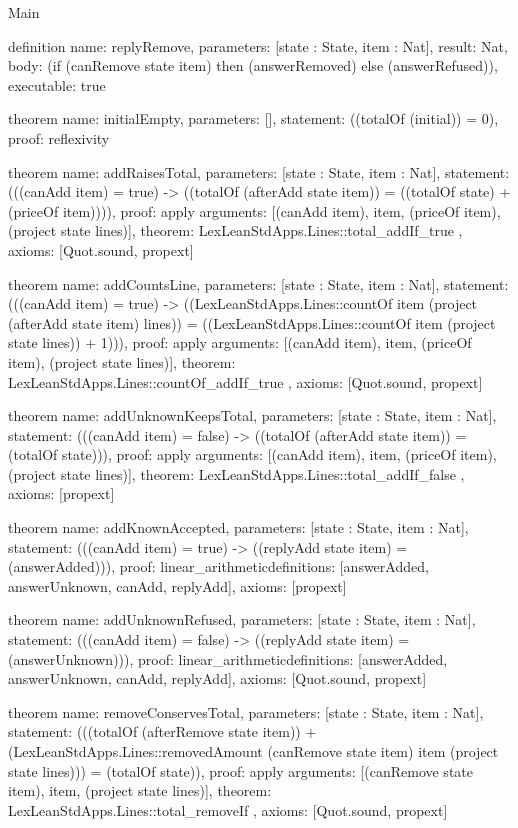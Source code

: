 \begin{lexlean}{Main}
\begin{semanticmodule}
definition{
  name: replyRemove,
  parameters: [state : State, item : Nat],
  result: Nat,
  body: (if (canRemove state item) then (answerRemoved) else (answerRefused)),
  executable: true
}

theorem{
  name: initialEmpty,
  parameters: [],
  statement: ((totalOf (initial)) = 0),
  proof: reflexivity{}
}

theorem{
  name: addRaisesTotal,
  parameters: [state : State, item : Nat],
  statement: (((canAdd item) = true) -> ((totalOf (afterAdd state item)) = ((totalOf state) + (priceOf item)))),
  proof: apply{
    arguments: [(canAdd item), item, (priceOf item), (project state lines)],
    theorem: LexLeanStdApps.Lines::total_addIf_true
  },
  axioms: [Quot.sound, propext]
}

theorem{
  name: addCountsLine,
  parameters: [state : State, item : Nat],
  statement: (((canAdd item) = true) -> ((LexLeanStdApps.Lines::countOf item (project (afterAdd state item) lines)) = ((LexLeanStdApps.Lines::countOf item (project state lines)) + 1))),
  proof: apply{
    arguments: [(canAdd item), item, (priceOf item), (project state lines)],
    theorem: LexLeanStdApps.Lines::countOf_addIf_true
  },
  axioms: [Quot.sound, propext]
}

theorem{
  name: addUnknownKeepsTotal,
  parameters: [state : State, item : Nat],
  statement: (((canAdd item) = false) -> ((totalOf (afterAdd state item)) = (totalOf state))),
  proof: apply{
    arguments: [(canAdd item), item, (priceOf item), (project state lines)],
    theorem: LexLeanStdApps.Lines::total_addIf_false
  },
  axioms: [propext]
}

theorem{
  name: addKnownAccepted,
  parameters: [state : State, item : Nat],
  statement: (((canAdd item) = true) -> ((replyAdd state item) = (answerAdded))),
  proof: linear_arithmetic{definitions: [answerAdded, answerUnknown, canAdd, replyAdd]},
  axioms: [propext]
}

theorem{
  name: addUnknownRefused,
  parameters: [state : State, item : Nat],
  statement: (((canAdd item) = false) -> ((replyAdd state item) = (answerUnknown))),
  proof: linear_arithmetic{definitions: [answerAdded, answerUnknown, canAdd, replyAdd]},
  axioms: [Quot.sound, propext]
}

theorem{
  name: removeConservesTotal,
  parameters: [state : State, item : Nat],
  statement: (((totalOf (afterRemove state item)) + (LexLeanStdApps.Lines::removedAmount (canRemove state item) item (project state lines))) = (totalOf state)),
  proof: apply{
    arguments: [(canRemove state item), item, (project state lines)],
    theorem: LexLeanStdApps.Lines::total_removeIf
  },
  axioms: [Quot.sound, propext]
}


\end{semanticmodule}
\end{lexlean}
